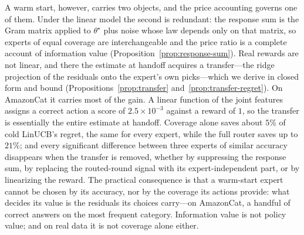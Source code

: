 \documentclass{article}
\theoremstyle{definition}
\theoremstyle{remark}
\theoremstyle{remark}
\begin{document}
A warm start, however, carries two objects, and the price accounting governs
one of them. Under the linear model the second is redundant: the response sum
is the Gram matrix applied to $\theta^\star$ plus noise whose law depends only
on that matrix, so experts of equal coverage are interchangeable and the price
ratio is a complete account of information value
(Proposition~\ref{prop:response-sum}). Real rewards are not linear, and there
the estimate at handoff acquires a transfer---the ridge projection of the
residuals onto the expert's own picks---which we derive in closed form and
bound (Propositions~\ref{prop:transfer} and~\ref{prop:transfer-regret}). On
AmazonCat it carries most of the gain. A linear function of the joint features
assigns a correct action a score of $2.5\times10^{-3}$ against a reward of $1$,
so the transfer is essentially the entire estimate at handoff. Coverage alone
saves about $5\%$ of cold LinUCB's regret, the same for every expert, while
the full router saves up to $21\%$; and every significant difference between
three experts of similar accuracy disappears when the transfer is removed,
whether by suppressing the response sum, by replacing the routed-round signal
with its expert-independent part, or by linearizing the reward. The practical
consequence is that a warm-start expert cannot be chosen by its accuracy, nor
by the coverage its actions provide: what decides its value is the residuals
its choices carry---on AmazonCat, a handful of correct answers on the most
frequent category. Information value is not policy value; and on real data it
is not coverage alone either.
\end{document}
